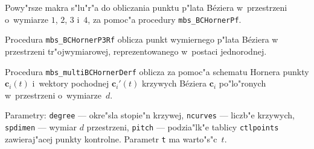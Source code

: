 \vspace{\bigskipamount}
\begin{sloppypar}
Powy"rsze makra s"lu"r"a do obliczania punktu p"lata B\'{e}ziera
w~przestrzeni o~wymiarze $1$, $2$, $3$ i~$4$, za pomoc"a procedury
\texttt{mbs\_BCHornerPf}.
\end{sloppypar}

\vspace{\bigskipamount}
Procedura \texttt{mbs\_BCHornerP3Rf} oblicza punkt wymiernego p"lata
B\'{e}ziera w przes\-trze\-ni tr"ojwymiarowej, reprezentowanego w~postaci
jednorodnej.

\vspace{\bigskipamount}
\begin{sloppypar}
Procedura \texttt{mbs\_multiBCHornerDerf} oblicza za pomoc"a schematu
Hornera punk\-ty $\bm{c}_i(t)$ i~wektory pochodnej $\bm{c}_i'(t)$ krzywych
B\'{e}ziera $\bm{c}_i$ po"lo"ronych w~przestrzeni o~wymiarze~$d$.
\end{sloppypar}

Parametry: \texttt{degree} --- okre"sla stopie"n krzywej, \texttt{ncurves}
--- liczb"e krzywych, \texttt{spdimen} --- wymiar $d$ przestrzeni,
\texttt{pitch} --- podzia"lk"e tablicy \texttt{ctlpoints} zawieraj"acej
punkty kontrolne. Parametr \texttt{t} ma warto"s"c~$t$.

